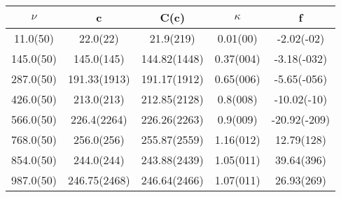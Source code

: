 \begin{table}[H]
	\centering
	\begin{tabular}{ccccc}
		$\nu$ & c & C(c) & $\kappa$ & f\\
		\hline
		11.0(50) & 22.0(22) & 21.9(219) & 0.01(00) & -2.02(-02)	\\
		145.0(50) & 145.0(145) & 144.82(1448) & 0.37(004) & -3.18(-032)	\\
		287.0(50) & 191.33(1913) & 191.17(1912) & 0.65(006) & -5.65(-056)	\\
		426.0(50) & 213.0(213) & 212.85(2128) & 0.8(008) & -10.02(-10)	\\
		566.0(50) & 226.4(2264) & 226.26(2263) & 0.9(009) & -20.92(-209)	\\
		768.0(50) & 256.0(256) & 255.87(2559) & 1.16(012) & 12.79(128)	\\
		854.0(50) & 244.0(244) & 243.88(2439) & 1.05(011) & 39.64(396)	\\
		987.0(50) & 246.75(2468) & 246.64(2466) & 1.07(011) & 26.93(269)	\\
	\end{tabular}
\end{table}